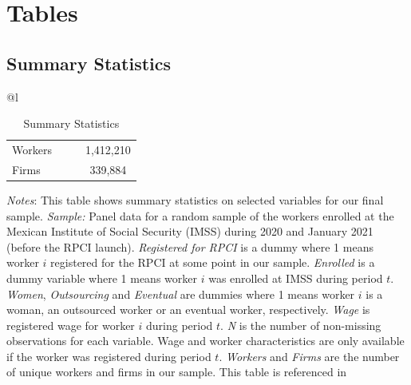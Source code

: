 \documentclass[oneside,11pt]{article}
\begin{document}
\section{Tables}

\subsection{Summary Statistics}

\begin{table}[H]
\footnotesize
\centering
\begin{threeparttable}
\centering
\caption{Summary Statistics\label{tab:summary_stats_rpci}}

\begin{tabular}[t]{@{}l}
\toprule
\toprule
\begin{tabular}[t]{lccc}

\midrule
Workers & & & 1,412,210\\
Firms & & & 339,884\\
\end{tabular}

\tabularnewline 
\bottomrule
\bottomrule

\end{tabular}

\begin{tablenotes}
\setlength{}
\scriptsize
\item \textit{Notes}: This table shows summary statistics on selected variables for our final sample. \textit{Sample:} Panel data for a random sample of the workers enrolled at the Mexican Institute of Social Security (IMSS) during 2020 and January 2021 (before the RPCI launch). \textit{Registered for RPCI} is a dummy where 1 means worker $i$ registered for the RPCI at some point in our sample. \textit{Enrolled} is a dummy variable where 1 means worker $i$ was enrolled at IMSS during period $t$. \textit{Women}, \textit{Outsourcing} and \textit{Eventual} are dummies where 1 means worker $i$ is a woman, an outsourced worker or an eventual worker, respectively. \textit{Wage} is registered wage for worker $i$ during period $t$. \textit{N} is the number of non-missing observations for each variable. Wage and worker characteristics are only available if the worker was registered during period $t$. \textit{Workers} and \textit{Firms} are the number of unique workers and firms in our sample. This table is referenced in %
\end{tablenotes}
\end{threeparttable}
\end{table}
\end{document}
